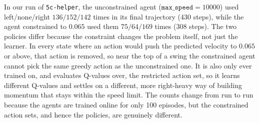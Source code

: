 \begin{solution}
In our run of \texttt{5c-helper}, the unconstrained agent ($\texttt{max\_speed}=10000$) used left/none/right
$136/152/142$ times in its final trajectory (430 steps), while the agent constrained to $0.065$ used them
$75/64/169$ times (308 steps). The two policies differ because the constraint changes the problem itself, not just
the learner. In every state where an action would push the predicted velocity to $0.065$ or above, that action is
removed, so near the top of a swing the constrained agent cannot pick the same greedy action as the unconstrained
one. It is also only ever trained on, and evaluates Q-values over, the restricted action set, so it learns different
Q-values and settles on a different, more right-heavy way of building momentum that stays within the speed limit.
The counts change from run to run because the agents are trained online for only 100 episodes, but the
constrained action sets, and hence the policies, are genuinely different.
\end{solution}

